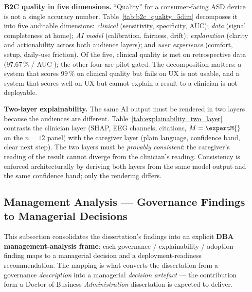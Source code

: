 \noindent\textbf{B2C quality in five dimensions.} ``Quality'' for a consumer-facing ASD device is not a single accuracy number. Table~\ref{tab:b2c_quality_5dim} decomposes it into five auditable dimensions: \emph{clinical} (sensitivity, specificity, AUC); \emph{data} (signal completeness at home); \emph{AI model} (calibration, fairness, drift); \emph{explanation} (clarity and actionability across both audience layers); and \emph{user experience} (comfort, setup, daily-use friction). Of the five, clinical quality is met on retrospective data (97.67\,\% / AUC \aucval{}); the other four are pilot-gated. The decomposition matters: a system that scores 99\,\% on clinical quality but fails on UX is not usable, and a system that scores well on UX but cannot explain a result to a clinician is not deployable.



\noindent\textbf{Two-layer explainability.} The same AI output must be rendered in two layers because the audiences are different. Table~\ref{tab:explainability_two_layer} contrasts the clinician layer (SHAP, EEG channels, citations, $M = \expertM{}$ on the $n = 12$ panel) with the caregiver layer (plain language, confidence band, clear next step). The two layers must be \emph{provably consistent}: the caregiver's reading of the result cannot diverge from the clinician's reading. Consistency is enforced architecturally by deriving both layers from the same model output and the same confidence band; only the rendering differs.



\subsection{Management Analysis --- Governance Findings to Managerial Decisions}
\label{sec:management_analysis}

This subsection consolidates the dissertation's findings into an explicit \textbf{DBA management-analysis frame}: each governance / explainability / adoption finding maps to a managerial decision and a deployment-readiness recommendation. The mapping is what converts the dissertation from a governance \emph{description} into a managerial \emph{decision artefact} — the contribution form a Doctor of Business \emph{Administration} dissertation is expected to deliver.

